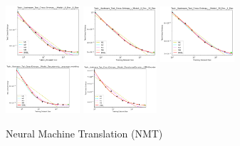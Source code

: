 \documentclass{article} %
\begin{document}
\begin{figure}
    \centering

\includegraphics[width=0.245\textwidth]{figures/scaling_laws_benchmark_dataset_plots__all_functional_forms/log_perplexity___6_Enc,_6_Dec.png}
\includegraphics[width=0.245\textwidth]{figures/scaling_laws_benchmark_dataset_plots__all_functional_forms/log_perplexity___6_Enc,_28_Dec.png}
\includegraphics[width=0.245\textwidth]{figures/scaling_laws_benchmark_dataset_plots__all_functional_forms/log_perplexity___28_Enc,_6_Dec.png}
\includegraphics[width=0.245\textwidth]{figures/scaling_laws_benchmark_dataset_plots__all_functional_forms/log_perplexity___Decoder-only,_Language_modeling.png}
\includegraphics[width=0.245\textwidth]{figures/scaling_laws_benchmark_dataset_plots__all_functional_forms/log_perplexity___Transfomer-Encoder,_LSTM-Decoder.png}

    \caption{
    Neural Machine Translation (NMT)
    }
    \label{fig:scaling_laws_benchmark_dataset_all_extrapolations__nmt}
\end{figure}
\end{document}
